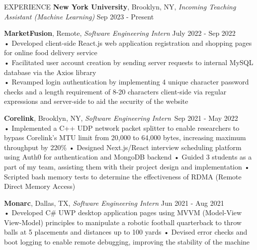 \documentclass{resume} %
\begin{document}
\begin{rSection}{EXPERIENCE}
\textbf{New York University}, Brooklyn, NY, {\emph{Incoming Teaching Assistant (Machine Learning)}} \hfill Sep 2023 - Present

\textbf{MarketFusion}, Remote, {\emph{Software Engineering Intern}} \hfill July 2022 - Sep 2022 \\
• Developed client-side React.js web application registration and shopping pages for online food delivery service \\
• Facilitated user account creation by sending server requests to internal MySQL database via the Axios library \\
• Revamped login authentication by implementing 4 unique character password checks and a length requirement of 8-20 characters client-side via regular expressions and server-side to aid the security of the website 

\textbf{Corelink}, Brooklyn, NY, {\emph{Software Engineering Intern}}\ \hfill Sep 2021 - May 2022 \\
• Implemented a C++ UDP network packet splitter to enable researchers to bypass Corelink's MTU limit from 20,000 to 64,000 bytes, increasing maximum throughput by 220\% \newline
• Designed Next.js/React interview scheduling platform using Auth0 for authentication and MongoDB backend \newline
• Guided 3 students as a part of my team, assisting them with their project design and implementation \newline
• Scripted bash memory tests to determine the effectiveness of RDMA (Remote Direct Memory Access) 

\textbf{Monarc}, Dallas, TX, {\emph{Software Engineering Intern}} \hfill Jun 2021 - Aug 2021 \\
• Developed C\# UWP desktop application pages using MVVM (Model-View View-Model) principles to manipulate a robotic football quarterback to throw balls at 5 placements and distances up to 100 yards \newline
• Devised error checks and boot logging to enable remote debugging, improving the stability of the machine \smallskip
\end{rSection} 



\end{document}
